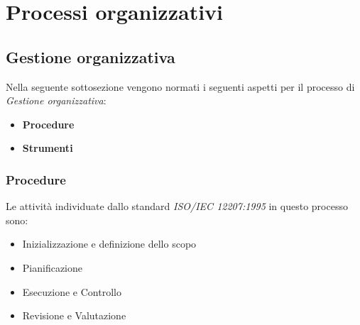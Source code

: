 \section{Processi organizzativi}

\subsection{Gestione organizzativa}
Nella seguente sottosezione vengono normati i seguenti aspetti per il
processo di \textit{Gestione organizzativa}:
\begin{itemize}
    \item \textbf{Procedure}
    \item \textbf{Strumenti}
\end{itemize}

\subsubsection{Procedure}
Le attività individuate dallo standard \textit{ISO/IEC 12207:1995} in questo processo sono:
\begin{itemize}
    \item Inizializzazione e definizione dello scopo
    \item Pianificazione
    \item Esecuzione e Controllo
    \item Revisione e Valutazione
\end{itemize}

